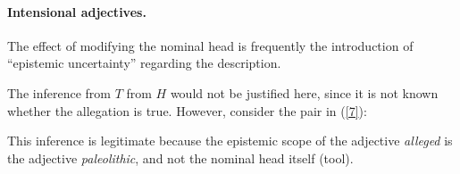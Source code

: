 \documentclass[10pt]{article}
\begin{document}
 \vspace{-.1in}

  \vspace{-.25in}
\paragraph{Intensional adjectives.} The effect of modifying the nominal head is frequently the introduction of ``epistemic uncertainty'' regarding the description. 

 \vspace{-.1in}
 \vspace{-.1in}
The inference from $T$ from $H$ would not be justified here, since it is not known whether the allegation is true. However, consider the pair in (\ref{7}):
 \vspace{-.1in}


 \vspace{-.1in}
\noindent This inference is legitimate because the epistemic scope of the adjective {\it alleged} is the adjective {\it paleolithic}, and not the nominal head  itself (tool). 
\end{document}
